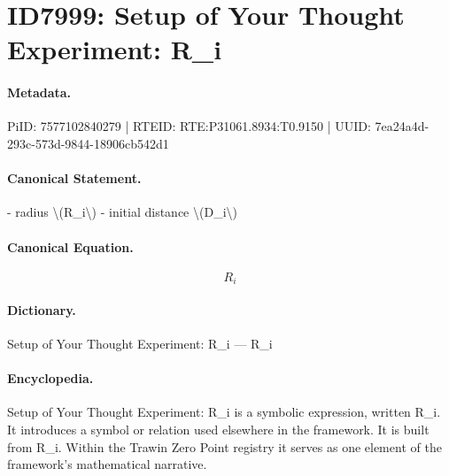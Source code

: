\section*{ID7999: Setup of Your Thought Experiment: R\_i}
\paragraph{Metadata.}
PiID: 7577102840279 | RTEID: RTE:P31061.8934:T0.9150 | UUID: 7ea24a4d-293c-573d-9844-18906cb542d1

\paragraph{Canonical Statement.}
- radius \textbackslash{}(R\_i\textbackslash{}) - initial distance \textbackslash{}(D\_i\textbackslash{})

\paragraph{Canonical Equation.}
\[
R_i
\]

\paragraph{Dictionary.}
Setup of Your Thought Experiment: R\_i — R\_i

\paragraph{Encyclopedia.}
Setup of Your Thought Experiment: R\_i is a symbolic expression, written R\_i. It introduces a symbol or relation used elsewhere in the framework. It is built from R\_i. Within the Trawin Zero Point registry it serves as one element of the framework's mathematical narrative.
